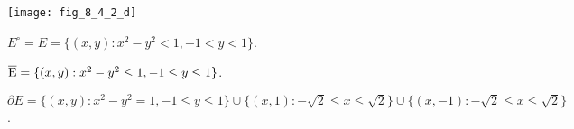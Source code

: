 \begin{Exercise}
\begin{enumerate}[a)]
\begin{sketch}
\begin{minipage}[h]{0.9\textwidth}
\centering
\texttt{[image: fig\_8\_4\_2\_d]}
\label{fig:8.4.2_d}
\end{minipage}

$E^\circ = E = \{(x,y):x^2-y^2<1,-1<y<1\}$.

$\overline{\rm E} =  \{(x,y):x^2-y^2\leq 1,-1\leq y\leq 1\}$.

$\partial E = \{(x,y):x^2-y^2 = 1,-1\leq y\leq 1\} \cup \{(x,1):-\sqrt{2}\leq x \leq \sqrt{2}\} \cup \{(x,-1):-\sqrt{2}\leq x \leq \sqrt{2}\}$.
\end{sketch}

\end{enumerate}
\end{Exercise}